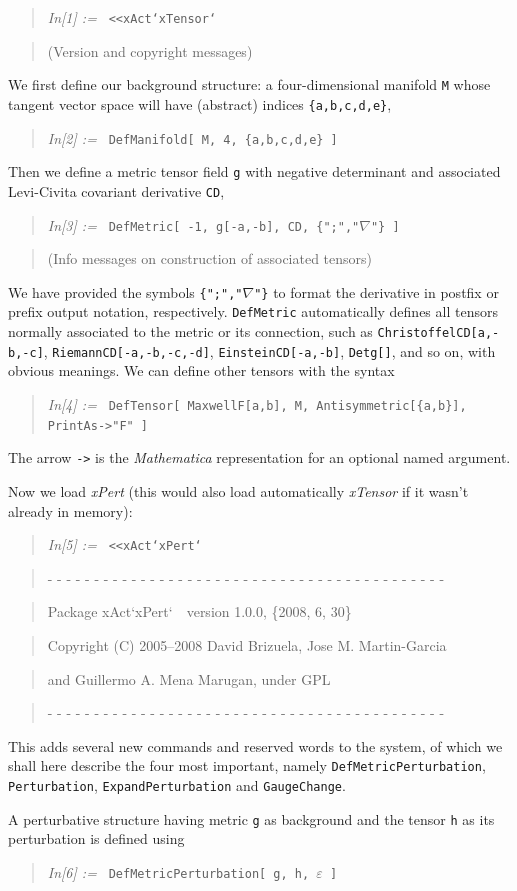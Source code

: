 \documentclass[aps,prd,showpacs]{revtex4}
\newcommand{\xPert}{{\em \lowercase{x}P\lowercase{ert}}}
\newcommand{\mathIn}[2]{
    \begin{quotation} {\em In[#1] :=\ } {\tt #2} \end{quotation}
}
\newcommand{\mathComment}[1]{
    \begin{quotation} \qquad\qquad #1 \end{quotation} 
}
\begin{document}
\mathIn{1}{<<xAct`xTensor`}
\mathComment{(Version and copyright messages)}

We first define our background structure: a four-dimensional
manifold {\tt M} whose tangent vector space will have
(abstract) indices {\tt \{a,b,c,d,e\}},

\mathIn{2}{DefManifold[ M, 4, \{a,b,c,d,e\} ]}

\noindent
Then we define a metric tensor field {\tt g} with negative determinant
and associated Levi-Civita covariant derivative {\tt CD},

\mathIn{3}{DefMetric[ -1, g[-a,-b], CD, \{";","$\nabla$"\} ]}
\mathComment{(Info messages on construction of associated tensors)}

\noindent We have provided the symbols {\tt \{";","$\nabla$"\}} to
format the derivative in postfix or prefix output notation, respectively.
{\tt DefMetric} automatically defines all tensors normally associated
to the metric or its connection, such as {\tt ChristoffelCD[a,-b,-c]},
{\tt RiemannCD[-a,-b,-c,-d]}, {\tt EinsteinCD[-a,-b]},
{\tt Detg[]}, and so on, with obvious meanings. We can define other
tensors with the syntax

\mathIn{4}{DefTensor[ MaxwellF[a,b], M, Antisymmetric[\{a,b\}], PrintAs->"F" ]}

\noindent The arrow {\tt ->} is the {\em Mathematica} representation
for an optional named argument.

Now we load \xPert\/ (this would also load automatically {\em xTensor}
if it wasn't already in memory):

\mathIn{5}{<<xAct`xPert`}
\mathComment{- - - - - - - - - - - - - - - - - - - - - - - - - - - - - - - - - - - - - - - - - - -}
\mathComment{Package xAct`xPert`\ \  version 1.0.0, \{2008, 6, 30\}}
\mathComment{Copyright (C) 2005--2008 David Brizuela, Jose M. Martin-Garcia}
\mathComment{ and Guillermo A. Mena Marugan, under GPL}
\mathComment{- - - - - - - - - - - - - - - - - - - - - - - - - - - - - - - - - - - - - - - - - - -}

\noindent This adds several new commands and reserved words to the system,
of which we shall here describe the four most important, namely
{\tt DefMetricPerturbation}, {\tt Perturbation},
{\tt ExpandPerturbation} and {\tt GaugeChange}.

A perturbative structure having metric {\tt g} as background and the
tensor {\tt h} as its perturbation is defined using

\mathIn{6}{DefMetricPerturbation[ g, h, $\varepsilon$ ]}
\end{document}
